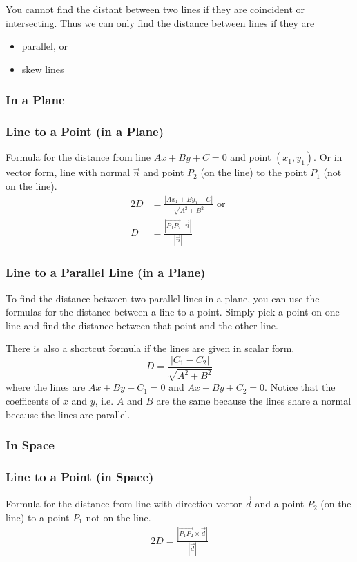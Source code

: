 \documentclass{report}
\theoremstyle{definition}
\numberwithin{equation}{section}
\begin{document}
\bigskip \noindent
You cannot find the distant between two lines if they are coincident or intersecting. Thus we can only find the distance between lines if they are
\begin{itemize}
	\item parallel, or
	\item skew lines
\end{itemize}

\subsubsection{In a Plane}
\subsubsection*{Line to a Point (in a Plane)}
Formula for the distance from line $Ax + By + C = 0$ and point $(x_1,y_1)$. Or in vector form, line with normal $\vec n$ and point $P_2$ (on the line) to the point $P_1$ (not on the line).
\begin{alignat}{2}{}
	D &= \frac{|Ax_1+By_1+C|}{\sqrt{A^2+B^2}} \textrm{ or } \\
	D &= \frac{|\overrightarrow{P_1P_2} \cdot \vec n |}{|\vec n|}
\end{alignat}
\subsubsection*{Line to a Parallel Line (in a Plane)}
To find the distance between two parallel lines in a plane, you can use the formulas for the distance between a line to a point. Simply pick a point on one line and find the distance between that point and the other line.

\bigskip \noindent
There is also a shortcut formula if the lines are given in scalar form.
\begin{equation}
	D = \frac{|C_1 - C_2|}{\sqrt{A^2+B^2}}
\end{equation}
where the lines are $Ax+By+C_1=0$ and $Ax+By+C_2=0$. Notice that the coefficents of $x$ and $y$, i.e. $A$ and $B$ are the same because the lines share a normal because the lines are parallel.

\subsubsection{In Space}
\subsubsection*{Line to a Point (in Space)}
Formula for the distance from line with direction vector $\vec d$ and a point $P_2$ (on the line) to a point $P_1$ not on the line.
\begin{alignat*}{2}{}
	D = \frac{|\overrightarrow{P_1P_2} \times \vec d |}{|\vec d|}
\end{alignat*}
\end{document}
